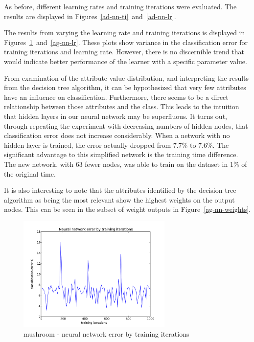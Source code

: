 \documentclass{sig-alternate}
\begin{document}
As before, different learning rates and training iterations were evaluated. The results are displayed in Figures~\ref{ad-nn-ti}~and~\ref{ad-nn-lr}.

The results from varying the learning rate and training iterations  is displayed in Figures~\ref{ag-nn-ti}~and~\ref{ag-nn-lr}. These plots show variance in the classification error for training iterations and learning rate. However, there is no discernible trend that would indicate better performance of the learner with a specific parameter value.

From examination of the attribute value distribution, and interpreting the results from the decision tree algorithm, it can be hypothesized that very few attributes have an influence on classification. Furthermore, there seems to be a direct relationship between those attributes and the class. This leads to the intuition that hidden layers in our neural network may be superfluous. It turns out, through repeating the experiment with decreasing numbers of hidden nodes, that classification error does not increase considerably. When a network with no hidden layer is trained, the error actually dropped from 7.7\% to 7.6\%. The significant advantage to this simplified network is the training time difference. The new network, with 63 fewer nodes, was able to train on the dataset in 1\% of the original time.

It is also interesting to note that the attributes identified by the decision tree algorithm as being the most relevant show the highest weights on the output nodes. This can be seen in the subset of weight outputs in Figure~\ref{ag-nn-weights}.


\begin{figure}[!htbp]
    \centering
    \includegraphics[width=3in]{data/agaricus-lepiota/perceptron/training-iterations.pdf}
    \caption{mushroom - neural network error by training iterations \label{ag-nn-ti}}
\end{figure} 
\end{document}
